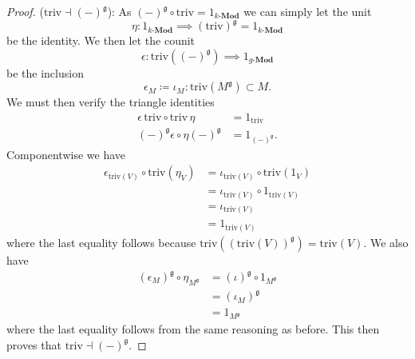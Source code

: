 \begin{proof}
  ($ \text{triv} \dashv (-)^\mathfrak{g} $): As $ (-)^\mathfrak{g} \circ \text{triv} = 1_{k\text{-}\mathbf{Mod}} $ we can simply let the unit
  \begin{equation}
    \eta: 1_{k\text{-}\mathbf{Mod}} \implies (\text{triv})^\mathfrak{g}=1_{k\text{-}\mathbf{Mod}}
  \end{equation}
  be the identity. We then let the counit
  \begin{equation}
    \epsilon:  \text{triv}((-)^\mathfrak{g}) \implies 1_{g\text{-}\mathbf{Mod}}
  \end{equation}
  be the inclusion
  \begin{equation}
    \epsilon_M \coloneqq \iota_M:\text{triv}(M^\mathfrak{g}) \subset M.
  \end{equation}
  We must then verify the triangle identities
  \begin{align*}
    \epsilon\,\text{triv} \circ \text{triv}\,\eta &= 1_{\text{triv}} \\
    (-)^\mathfrak{g}\epsilon \circ \eta (-)^\mathfrak{g} &= 1_{(-)^\mathfrak{g}}
  .\end{align*}
  Componentwise we have
  \begin{align*}
    \epsilon_{\text{triv}(V)} \circ \text{triv}(\eta_V) &= \iota_{\text{triv}(V)} \circ \text{triv}(1_V) \\
                                                        &= \iota_{\text{triv}(V)} \circ 1_{\text{triv}(V)} \\
                                                        &= \iota_{\text{triv}(V)} \\
                                                        &= 1_{\text{triv}(V)}
  \end{align*}
  where the last equality follows because $ \text{triv}((\text{triv}(V))^\mathfrak{g}) = \text{triv}(V) $. We also have
  \begin{align*}
    (\epsilon_M)^\mathfrak{g} \circ \eta_{M^\mathfrak{g}} &= (\iota)^\mathfrak{g} \circ 1_{M^\mathfrak{g}} \\
                                                          &= (\iota_M)^\mathfrak{g} \\
                                                          &= 1_{M^\mathfrak{g}}
  \end{align*}
  where the last equality follows from the same reasoning as before. This then proves that $ \text{triv} \dashv (-)^\mathfrak{g} $.
\end{proof}

